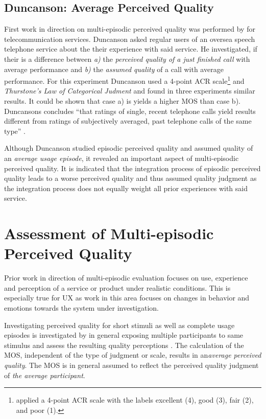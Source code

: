 

\subsection{Duncanson: Average Perceived Quality}
First work in direction on multi-episodic perceived quality was performed by \cite{duncanson_average_1969} for telecommunication services.
Duncanson asked regular users of an oversea speech telephone service about the their experience with said service.
He investigated, if their is a difference between \emph{a)} the \emph{perceived quality of a just finished call} with average performance and \emph{b)} the \emph{assumed quality} of a call with average performance.
For this experiment Duncanson used a 4-point \ac{ACR} scale\footnote{\cite{duncanson_average_1969} applied a 4-point \ac{ACR} scale with the labels excellent (4), good (3), fair (2), and poor (1).} and \emph{Thurstone's Law of Categorical Judment} and found in three experiments similar results.
It could be shown that case a) is yields a higher \ac{MOS} than case b).
Duncansons concludes ``that ratings of single, recent telephone calls
yield results different from ratings of subjectively averaged, past
telephone calls of the same type'' \citep[][p. 116]{duncanson_average_1969}.

Although Duncanson studied episodic perceived quality and assumed quality of an \emph{average usage episode}, it revealed an important aspect of multi-episodic perceived quality.
It is indicated that the integration process of episodic perceived quality leads to a worse perceived quality and thus assumed quality judgment as the integration process does not equally weight all prior experiences with said service.

\section{Assessment of Multi-episodic Perceived Quality}
Prior work in direction of multi-episodic evaluation focuses on use, experience and perception of a service or product under realistic conditions.
This is especially true for \ac{UX} as work in this area focuses on changes in behavior and emotions towards the system under investigation.

Investigating perceived quality for short stimuli as well as complete usage episodes is investigated by in general exposing multiple participants to same stimulus and assess the resulting quality perceptions \citep[cf.][p. 11]{blauert_spatial_1996}. %
The calculation of the \ac{MOS}, independent of the type of judgment or scale, results in an\emph{average perceived quality}.
The \ac{MOS} is in general assumed to reflect the perceived quality judgment of \emph{the average participant}.


